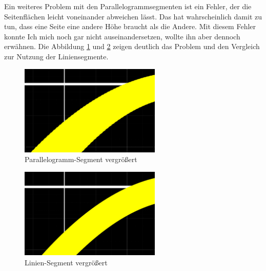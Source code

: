 \FloatBarrier
Ein weiteres Problem mit den Parallelogrammsegmenten ist ein Fehler, der die Seitenflächen leicht voneinander abweichen lässt.
Das hat wahrscheinlich damit zu tun, dass eine Seite eine andere Höhe braucht als die Andere.
Mit diesem Fehler konnte Ich mich noch gar nicht auseinandersetzen, wollte ihn aber dennoch erwähnen.
Die Abbildung \ref{fig:parallelogramm-kante} und \ref{fig:linie-kante} zeigen deutlich das Problem und den Vergleich zur Nutzung der Liniensegmente.
\begin{figure}[ht]
	\centering
	\includegraphics[width=0.6\textwidth]{fig/parallelogramm-kante.png}
	\caption{Parallelogramm-Segment vergrößert}
	\label{fig:parallelogramm-kante}
\end{figure}
\FloatBarrier
\begin{figure}[ht]
	\centering
	\includegraphics[width=0.6\textwidth]{fig/linie-kante.png}
	\caption{Linien-Segment vergrößert}
	\label{fig:linie-kante}
\end{figure}
\FloatBarrier

